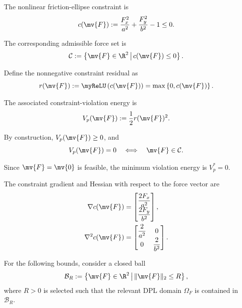 The nonlinear friction-ellipse constraint is
\begin{equation}
	\label{Tire:eq:regularity:constraint}
	c(\mv{F})
	:=
	\frac{F_x^2}{a^2}
	+
	\frac{F_y^2}{b^2}
	-
	1
	\leq
	0
	.
\end{equation}

The corresponding admissible force set is
\begin{equation}
	\mathcal{C}
	:=
	\left\{
	\mv{F}\in\R^2
	\,\middle|\,
	c(\mv{F})\leq0
	\right\}
	.
\end{equation}

Define the nonnegative constraint residual as
\begin{equation}
	r(\mv{F})
	:=
	\myReLU
	\left(
	c(\mv{F})
	\right)
	=
	\max
	\left\{
	0,c(\mv{F})
	\right\}
	.
\end{equation}

The associated constraint-violation energy is
\begin{equation}
	\label{Tire:eq:violation:energy}
	V_p(\mv{F})
	:=
	\frac{1}{2}
	r(\mv{F})^2
	.
\end{equation}

By construction, $V_p(\mv{F})\geq0$, and
\begin{equation}
	V_p(\mv{F})
	=
	0
	\quad
	\Longleftrightarrow
	\quad
	\mv{F}\in\mathcal{C}
	.
\end{equation}

Since $\mv{F}=\mv{0}$ is feasible, the minimum violation energy is $V_p^*=0$.

The constraint gradient and Hessian with respect to the force vector are
\begin{equation}
	\label{Tire:eq:constraint:derivatives}
	\begin{aligned}
		\nabla c(\mv{F})
		 & =
		\begin{bmatrix}
			\dfrac{2F_x}{a^2}
			\\
			\dfrac{2F_y}{b^2}
		\end{bmatrix}
		,
		\\
		\nabla^2 c(\mv{F})
		 & =
		\begin{bmatrix}
			\dfrac{2}{a^2} & 0
			\\
			0              & \dfrac{2}{b^2}
		\end{bmatrix}
		.
	\end{aligned}
\end{equation}

For the following bounds, consider a closed ball
\begin{equation}
	\mathcal{B}_R
	:=
	\left\{
	\mv{F}\in\R^2
	\,\middle|\,
	\|\mv{F}\|_2\leq R
	\right\}
	,
\end{equation}
where $R>0$ is selected such that the relevant
DPL domain $\Omega_F$ is contained in
$\mathcal{B}_R$.

